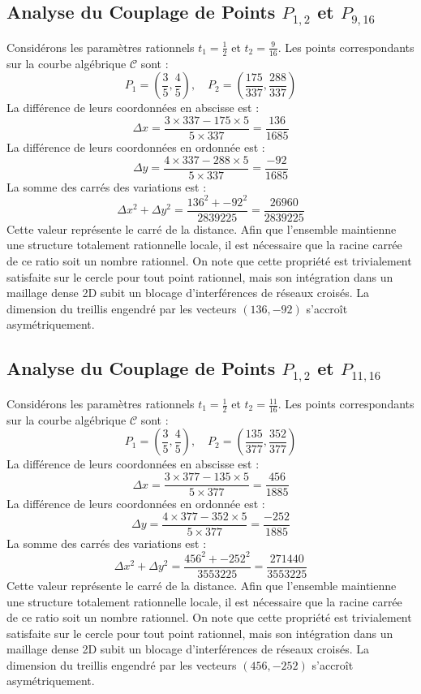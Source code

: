 \documentclass[12pt, a4paper]{article}
\begin{document}
\subsection{Analyse du Couplage de Points $P_{1,2}$ et $P_{9,16}$}
Considérons les paramètres rationnels $t_1 = \frac{1}{2}$ et $t_2 = \frac{9}{16}$.
Les points correspondants sur la courbe algébrique $\mathcal{C}$ sont :
$$ P_1 = \left( \frac{3}{5}, \frac{4}{5} \right), \quad P_2 = \left( \frac{175}{337}, \frac{288}{337} \right) $$
La différence de leurs coordonnées en abscisse est :
$$ \Delta x = \frac{3 \times 337 - 175 \times 5}{5 \times 337} = \frac{136}{1685} $$
La différence de leurs coordonnées en ordonnée est :
$$ \Delta y = \frac{4 \times 337 - 288 \times 5}{5 \times 337} = \frac{-92}{1685} $$
La somme des carrés des variations est :
$$ \Delta x^2 + \Delta y^2 = \frac{ 136^2 + -92^2 }{ 2839225 } = \frac{ 26960 }{ 2839225 } $$
Cette valeur représente le carré de la distance. Afin que l'ensemble maintienne une structure totalement rationnelle locale, il est nécessaire que la racine carrée de ce ratio soit un nombre rationnel. On note que cette propriété est trivialement satisfaite sur le cercle pour tout point rationnel, mais son intégration dans un maillage dense 2D subit un blocage d'interférences de réseaux croisés. La dimension du treillis engendré par les vecteurs $( 136, -92 )$ s'accroît asymétriquement.


\subsection{Analyse du Couplage de Points $P_{1,2}$ et $P_{11,16}$}
Considérons les paramètres rationnels $t_1 = \frac{1}{2}$ et $t_2 = \frac{11}{16}$.
Les points correspondants sur la courbe algébrique $\mathcal{C}$ sont :
$$ P_1 = \left( \frac{3}{5}, \frac{4}{5} \right), \quad P_2 = \left( \frac{135}{377}, \frac{352}{377} \right) $$
La différence de leurs coordonnées en abscisse est :
$$ \Delta x = \frac{3 \times 377 - 135 \times 5}{5 \times 377} = \frac{456}{1885} $$
La différence de leurs coordonnées en ordonnée est :
$$ \Delta y = \frac{4 \times 377 - 352 \times 5}{5 \times 377} = \frac{-252}{1885} $$
La somme des carrés des variations est :
$$ \Delta x^2 + \Delta y^2 = \frac{ 456^2 + -252^2 }{ 3553225 } = \frac{ 271440 }{ 3553225 } $$
Cette valeur représente le carré de la distance. Afin que l'ensemble maintienne une structure totalement rationnelle locale, il est nécessaire que la racine carrée de ce ratio soit un nombre rationnel. On note que cette propriété est trivialement satisfaite sur le cercle pour tout point rationnel, mais son intégration dans un maillage dense 2D subit un blocage d'interférences de réseaux croisés. La dimension du treillis engendré par les vecteurs $( 456, -252 )$ s'accroît asymétriquement.
\end{document}
